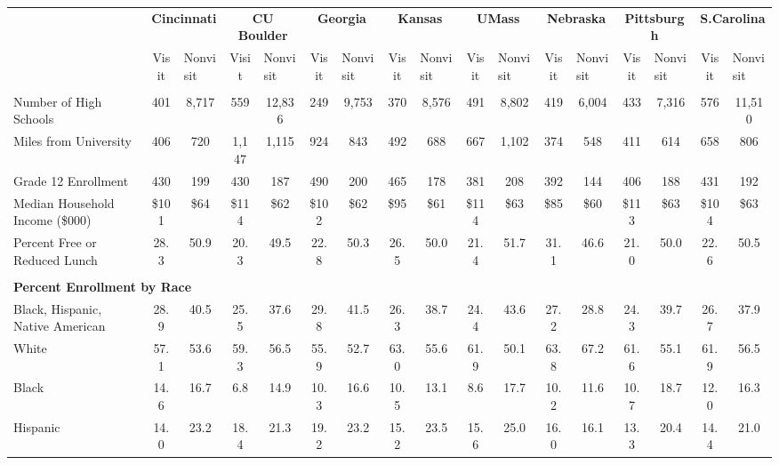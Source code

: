 \begin{tabular*}{\linewidth}{@{\extracolsep{\fill} } lcccccccccccccccc}%
&\multicolumn{2}{c}{\bfseries Cincinnati}&\multicolumn{2}{c}{\bfseries CU Boulder}&\multicolumn{2}{c}{\bfseries Georgia}&\multicolumn{2}{c}{\bfseries Kansas}&\multicolumn{2}{c}{\bfseries UMass}&\multicolumn{2}{c}{\bfseries Nebraska}&\multicolumn{2}{c}{\bfseries Pittsburgh}&\multicolumn{2}{c}{\bfseries S.Carolina}\\%
&Visit&\multicolumn{1}{l}{Nonvisit}&Visit&\multicolumn{1}{l}{Nonvisit}&Visit&\multicolumn{1}{l}{Nonvisit}&Visit&\multicolumn{1}{l}{Nonvisit}&Visit&\multicolumn{1}{l}{Nonvisit}&Visit&\multicolumn{1}{l}{Nonvisit}&Visit&\multicolumn{1}{l}{Nonvisit}&Visit&\multicolumn{1}{l}{Nonvisit}\\%
\hline%
&&&&&&&&&&&&&&&&\\%
\hspace{0cm}Number of High Schools&401&8,717&559&12,836&249&9,753&370&8,576&491&8,802&419&6,004&433&7,316&576&11,510\\%
\hspace{0cm}Miles from University&406&720&1,147&1,115&924&843&492&688&667&1,102&374&548&411&614&658&806\\%
\hspace{0cm}Grade 12 Enrollment&430&199&430&187&490&200&465&178&381&208&392&144&406&188&431&192\\%
\hspace{0cm}Median Household Income (\$000)&\$101&\$64&\$114&\$62&\$102&\$62&\$95&\$61&\$114&\$63&\$85&\$60&\$113&\$63&\$104&\$63\\%
\hspace{0cm}Percent Free or Reduced Lunch&28.3&50.9&20.3&49.5&22.8&50.3&26.5&50.0&21.4&51.7&31.1&46.6&21.0&50.0&22.6&50.5\\%
&&&&&&&&&&&&&&&&\\%
\multicolumn{17}{l}{\bfseries Percent Enrollment by Race}\\%
\hspace{0.2cm}Black, Hispanic, Native American&28.9&40.5&25.5&37.6&29.8&41.5&26.3&38.7&24.4&43.6&27.2&28.8&24.3&39.7&26.7&37.9\\%
\hspace{0.2cm}White&57.1&53.6&59.3&56.5&55.9&52.7&63.0&55.6&61.9&50.1&63.8&67.2&61.6&55.1&61.9&56.5\\%
\hspace{0.2cm}Black&14.6&16.7&6.8&14.9&10.3&16.6&10.5&13.1&8.6&17.7&10.2&11.6&10.7&18.7&12.0&16.3\\%
\hspace{0.2cm}Hispanic&14.0&23.2&18.4&21.3&19.2&23.2&15.2&23.5&15.6&25.0&16.0&16.1&13.3&20.4&14.4&21.0\\%

\end{tabular*}
